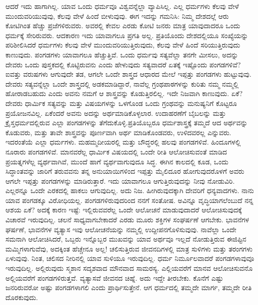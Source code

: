 \vskip 5pt

ಆದರೆ ಇದು ಹಾಗಾಗಿಲ್ಲ. ಯಾವ ಒಂದು ಧರ್ಮವೂ ವಿಶ್ವವನ್ನೆಲ್ಲಾ ವ್ಯಾಪಿಸಿಲ್ಲ. ಎಲ್ಲ ಧರ್ಮಗಳು ಕೆಲವು ವೇಳೆ ಮುಂದುವರಿಯುವುವು, ಕೆಲವು ವೇಳೆ ಹಿಂದೆ ಬೀಳುವುವು. ಈಗ ಇದನ್ನು ಗಮನಿಸಿ: ನಿಮ್ಮ ದೇಶದಲ್ಲೆ ಆರು ಕೋಟಿಗಿಂತ ಹೆಚ್ಚು ಪ್ರಜೆಗಳಿರುವರು. ಅವರಲ್ಲಿ ಕೇವಲ ಎರಡು ಕೋಟಿ ಜನರು ಮಾತ್ರ ಯಾವುದಾದರೂ ಒಂದು ಧರ್ಮಕ್ಕೆ ಸೇರಿರುವರು. ಆದಕಾರಣ ಇದು ಯಾವಾಗಲೂ ಪ್ರಗತಿ ಅಲ್ಲ. ಪ್ರತಿಯೊಂದು ದೇಶದಲ್ಲಿಯೂ ಸಂಖ್ಯೆಯನ್ನು ಪರಿಶೀಲಿಸಿದರೆ ಧರ್ಮಗಳು ಕೆಲವು ವೇಳೆ ಮುಂದುವರಿಯುತ್ತಿರುವುದು, ಕೆಲವು ವೇಳೆ ಹಿಂದೆ ಸರಿಯುತ್ತಿರುವುದು ಕಾಣುವುದು. ಪಂಗಡಗಳು ಯಾವಾಗಲೂ ಹೆಚ್ಚುತ್ತಿವೆ. ಒಂದು ಧರ್ಮವು ಸತ್ಯವೆಲ್ಲಾ ತನಗೇ ಮೀಸಲು, ಅದನ್ನು ದೇವರು ಒಂದು ಪುಸ್ತಕದಲ್ಲಿ ಕೊಟ್ಟಿರುವನು ಎಂದು ಹೇಳುವುದು ಸತ್ಯವಾದರೆ ಏತಕ್ಕೆ ಇಷ್ಟೊಂದು ಪಂಗಡಗಳಿವೆ? ಐವತ್ತು ವರುಷಗಳು ಆಗುವುದೇ ತಡ, ಆಗಲೇ ಒಂದೇ ಶಾಸ್ತ್ರದ ಆಧಾರದ ಮೇಲೆ ಇಪ್ಪತ್ತು ಪಂಗಡಗಳು ಹುಟ್ಟುವುವು. ದೇವರು ಸತ್ಯವನ್ನೆಲ್ಲಾ ಒಂದೇ ಶಾಸ್ತ್ರದಲ್ಲಿ ಅಡಕಮಾಡಿದ್ದಾರೆ, ನಾವೆಲ್ಲ ಗ್ರಂಥಪಾಠಗಳನ್ನು ಕುರಿತು ನಮ್ಮ ನಮ್ಮಲ್ಲಿ ಹೋರಾಡಬಹುದು ಎಂದು ಅವನು ನಮಗೆ ಆ ಶಾಸ್ತ್ರವನ್ನು ಕೊಡುತ್ತಿರಲಿಲ್ಲ. ಇದೇ ನಿಜವಾಗಿ ಕಾಣುವುದು. ಏಕೆ? ದೇವರು ಧಾರ್ಮಿಕ ಸತ್ಯವನ್ನು ಮತ್ತು ವಿಷಯಗಳನ್ನು ಒಳಗೊಂಡ ಒಂದು ಗ್ರಂಥವನ್ನು ಮನುಷ್ಯನಿಗೆ ಕೊಟ್ಟರೂ ಪ್ರಯೋಜನವಿಲ್ಲ. ಏಕೆಂದರೆ ಅವನು ಅದನ್ನು ಅರ್ಥಮಾಡಿಕೊಳ್ಳಲಾರ. ಉದಾಹರಣೆಗೆ ಬೈಬಲನ್ನು ಮತ್ತು ಕ್ರೈಸ್ತಧರ್ಮದಲ್ಲಿರುವ ಎಲ್ಲಾ ಪಂಗಡಗಳನ್ನು ತೆಗೆದುಕೊಳ್ಳಿ.ಪ್ರತಿಯೊಬ್ಬರೂ ಧರ್ಮಶಾಸ್ತ್ರಕ್ಕೆ ತಮ್ಮದೆ ಆದ ಅರ್ಥವನ್ನು ಕೊಡುವರು, ಮತ್ತು ತಾವೇ ಶಾಸ್ತ್ರವನ್ನು ಪೂರ್ಣವಾಗಿ ಅರ್ಥ ಮಾಡಿಕೊಂಡವರು, ಉಳಿದವರಲ್ಲ ಎನ್ನುವರು. ಇದರಂತೆಯೆ ಎಲ್ಲಾ ಧರ್ಮಗಳು. ಮಹಮ್ಮದೀಯರಲ್ಲಿ ಮತ್ತು ಬೌದ್ಧರಲ್ಲಿ ಹಲವು ಪಂಗಡಗಳಿವೆ. ಹಿಂದೂಗಳಲ್ಲಿ ನೂರಾರು ಪಂಗಡಗಳಿವೆ. ಮಾನವರೆಲ್ಲ ಧಾರ್ಮಿಕ ವಿಷಯದಲ್ಲಿ ಒಂದೇ ರೀತಿ ಆಲೋಚಿಸುವಂತೆ ಮಾಡಿದ ಪ್ರಯತ್ನಗಳೆಲ್ಲ ವ್ಯರ್ಥವಾಗಿವೆ, ಮುಂದೆ ಹಾಗೆ ವ್ಯರ್ಥವಾಗುವುದೂ ಸಿದ್ಧ. ಈಗಿನ ಕಾಲದಲ್ಲಿ ಕೂಡ, ಒಂದು ಸಿದ್ಧಾಂತವನ್ನು ಜಾರಿಗೆ ತರುವವನು ತನ್ನ ಅನುಯಾಯಿಗಳಿಂದ ಇಪ್ಪತ್ತು ಮೈಲಿದೂರ ಹೋಗುವುದರೊಳಗೆ ಅವರು ಆಗಲೇ ಇಪ್ಪತ್ತು ಪಂಗಡಗಳನ್ನು ಮಾಡಿರುತ್ತಾರೆ. ಇದು ಯಾವಾಗಲೂ ಆಗುತ್ತಿರುವುದನ್ನು ನೀವು ನೋಡುವಿರಿ. ಎಲ್ಲರನ್ನೂ ಒಂದೇ ಎರಕದಲ್ಲಿ ಹಾಕಲು ಆಗುವುದಿಲ್ಲ. ಅದು ನಿಜ. ಹೀಗಿರುವುದಕ್ಕಾಗಿ ದೇವರಿಗೆ ಧನ್ಯವಾದಗಳು. ನಾನು ಯಾವ ಪಂಗಡಕ್ಕೂ ವಿರೋಧಿಯಲ್ಲ. ಪಂಗಡಗಳಿರುವುದರಿಂದ ನನಗೆ ಸಂತೋಷ. ಅವಿನ್ನೂ ವೃದ್ಧಿಯಾಗಲೆಂಬುದೆ ನನ್ನ ಆಶಯ ಏಕೆ? ಅದಕ್ಕೆ ಕಾರಣ ಇಷ್ಟೆ: ಇಲ್ಲಿರುವವರೆಲ್ಲ ಒಂದೇ ಆಲೋಚನೆ ಮಾಡುವುದಾದರೆ ಆಲೋಚಿಸುವುದಕ್ಕೆ ವಿಚಾರವೆ ಇರುವುದಿಲ್ಲ. ಚಲನೆ ಸಾಧ್ಯವಾಗಬೇಕಾದರೆ ಎರಡು ಮೂರು ಶಕ್ತಿಗಳ ಸಂಘರ್ಷಣೆ ಆಗಬೇಕು. ಭಾವನೆಗಳ ಘರ್ಷಣೆ, ಭಾವನೆಗಳ ವ್ಯತ್ಯಾಸ ಇವು ಆಲೋಚನೆಯನ್ನು ನಮ್ಮಲ್ಲಿ ಉದ್ದೀಪನಗೊಳಿಸುವುವು. ನಾವೆಲ್ಲಾ ಒಂದೇ ಸಮನಾಗಿ ಆಲೋಚಿಸಿದರೆ, ಒಬ್ಬರು ಇನ್ನೊಬ್ಬರ ಮುಖವನ್ನು ಯಾವ ಅರ್ಥವೂ ಇಲ್ಲದೆ ನೋಡುತ್ತಿರುವ ಈಜಿಪ್ಟಿನ ಮಮ್ಮಿಗಳಾಗುವೆವು, ಅದಕ್ಕಿಂತ ಹೆಚ್ಚೇನೂ ಅಲ್ಲ! ಚಲಿಸುತ್ತಿರುವ ಜೀವನದಿಗಳಲ್ಲಿ ಮಾತ್ರ ಸುಳಿಗಳು ಮತ್ತು ತರಂಗಗಳು ಏಳುವುವು. ನಿಂತ, ಚಲಿಸದ ನೀರಿನಲ್ಲಿ ಯಾವ ಸುಳಿಯೂ ಇರುವುದಿಲ್ಲ. ಧರ್ಮ ನಿರ್ಮೂಲವಾದರೆ ಪಂಗಡಗಳಾವುವೂ ಇರುವುದಿಲ್ಲ. ಅಲ್ಲಿರುವುದು ಸ್ಮಶಾನ ಸದೃಶವಾದ ಮೌನವಾದ ಸಾಮರಸ್ಯ. ಎಲ್ಲಿಯವರೆಗೆ ಮಾನವ ಆಲೋಚಿಸುವನೊ ಅಲ್ಲಿಯವರೆಗೆ ಪಂಗಡಗಳಿರುತ್ತವೆ. ವ್ಯತ್ಯಾಸವೆ ಜೀವನದ ಚಿಹ್ನೆ. ಅದು ಇದ್ದೇ ತೀರಬೇಕು. ಕೊನೆಗೆ ಎಷ್ಟು ಜನರಿರುವರೋ ಅಷ್ಟು ಪಂಗಡಗಳಾಗಲಿ ಎಂದು ಪ್ರಾರ್ಥಿಸುತ್ತೇನೆ. ಆಗ ಧರ್ಮದಲ್ಲಿ ತಮ್ಮದೇ ಮಾರ್ಗ, ತಮ್ಮದೇ ರೀತಿ ದೊರಕುವುದು.

